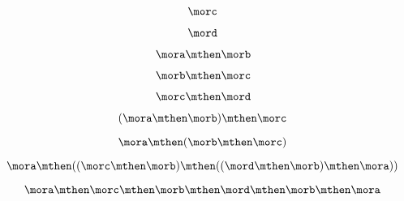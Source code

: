 {\begin{forslides}
        \begin{equation}
            \label{eq:06}
            \morc
        \end{equation}

        \begin{equation}
            \label{eq:07}
            \mord
        \end{equation}

        \begin{equation}
            \label{eq:08}
            \mora \mthen \morb
        \end{equation}

        \begin{equation}
            \label{eq:09}
            \morb \mthen \morc
        \end{equation}

        \begin{equation}
            \label{eq:10}
            \morc \mthen \mord
        \end{equation}

        \begin{equation}
            \label{eq:11}
            (\mora \mthen \morb) \mthen \morc
        \end{equation}

        \begin{equation}
            \label{eq:12}
            \mora \mthen  (\morb \mthen \morc )
        \end{equation}

        \begin{equation}
            \label{eq:13}
            \mora \mthen  ((\morc \mthen \morb ) \mthen (( \mord \mthen \morb ) \mthen \mora ))
        \end{equation}

        \begin{equation}
            \label{eq:14}
            \mora \mthen  \morc \mthen \morb  \mthen \mord \mthen \morb  \mthen \mora
        \end{equation}


\end{forslides}}
